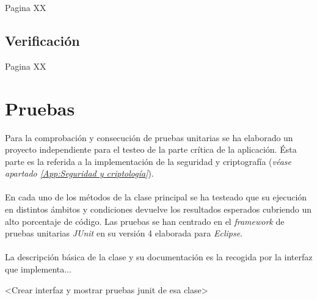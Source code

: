 \documentclass[../PFC.tex]{subfiles}
\begin{document}
Pagina XX

\subsection{Verificación}
\label{App:Verificacion}

Pagina XX


\section{Pruebas}
\label{App:Pruebas}

Para la comprobación y consecución de pruebas unitarias se ha elaborado un proyecto independiente para el testeo de la parte crítica de la aplicación. Ésta parte es la referida a la implementación de la seguridad y criptografía (\textit{véase apartado \ref{App:Seguridad y criptología}}).
\\\\
En cada uno de los métodos de la clase principal se ha testeado que su ejecución en distintos ámbitos y condiciones devuelve los resultados esperados cubriendo un alto porcentaje de código. Las pruebas se han centrado en el \textit{framework} de pruebas unitarias \textit{JUnit}\cite{junit} en su versión 4 elaborada para \textit{Eclipse}\cite{eclipse}.
\\\\
La descripción básica de la clase y su documentación es la recogida por la interfaz que implementa...

<Crear interfaz y mostrar pruebas junit de esa clase>
\end{document}
